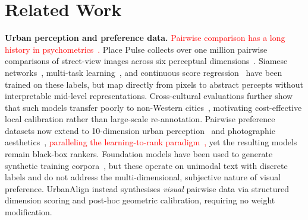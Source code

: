 \documentclass[runningheads]{llncs}
\begin{document}
\section{Related Work}
\label{sec:related}

\noindent\textbf{Urban perception and preference data.}
\textcolor{red}{Pairwise comparison has a long history in psychometrics~\cite{thurstone1927law,bradley1952rank}.}
Place Pulse collects over one million pairwise comparisons of street-view images across six perceptual dimensions~\cite{salesses2013collaborative}.
Siamese networks~\cite{dubey2016deep}, multi-task learning~\cite{zhang2018measuring}, and continuous score regression~\cite{naik2014streetscore} have been trained on these labels, but map directly from pixels to abstract percepts without interpretable mid-level representations.
Cross-cultural evaluations further show that such models transfer poorly to non-Western cities~\cite{pp2chinese2025}, motivating cost-effective local calibration rather than large-scale re-annotation.
Pairwise preference datasets now extend to 10-dimension urban perception~\cite{quintana2025specs} and photographic aesthetics~\cite{murray2012ava}, \textcolor{red}{paralleling the learning-to-rank paradigm~\cite{joachims2002optimizing},} yet the resulting models remain black-box rankers.
Foundation models have been used to generate synthetic training corpora~\cite{ye2022zerogen,meng2023tuning}, but these operate on unimodal text with discrete labels and do not address the multi-dimensional, subjective nature of visual preference.
UrbanAlign instead synthesises \emph{visual} pairwise data via structured dimension scoring and post-hoc geometric calibration, requiring no weight modification.
\end{document}
